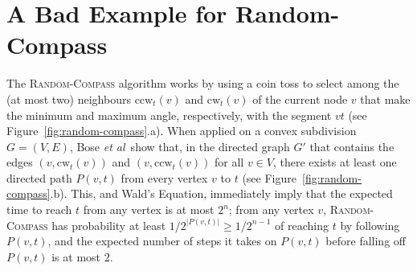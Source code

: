 \documentclass [letterpaper] {patmorin}
\newcommand{\etal}{\emph{et al}}
\newcommand{\ccw}{\mathrm{ccw}}
\newcommand{\cw}{\mathrm{cw}}
\begin{document}
\section{A Bad Example for Random-Compass}

The \textsc{Random-Compass} algorithm works by using a coin toss to select among the (at most two) neighbours $\ccw_t(v)$ and $\cw_t(v)$ of the current node $v$ that make the minimum and maximum angle, respectively, with the segment $vt$ (see Figure~\ref{fig:random-compass}.a). When applied on a convex subdivision $G=(V,E)$, Bose \etal\ show that, in the directed graph $G'$ that contains the edges $(v,\cw_t(v))$ and $(v,\ccw_t(v))$ for all $v\in V$, there exists at least one directed path $P(v,t)$ from every vertex $v$ to $t$ (see Figure~\ref{fig:random-compass}.b).  This, and Wald's Equation, immediately imply that the expected time to reach $t$ from any vertex is at most $2^{n}$; from any vertex $v$, \textsc{Random-Compass} has probability at least $1/2^{|P(v,t)|}\ge 1/2^{n-1}$ of reaching $t$ by following $P(v,t)$, and the expected number of steps it takes on $P(v,t)$ before falling off $P(v,t)$ is at most 2.
\end{document}
